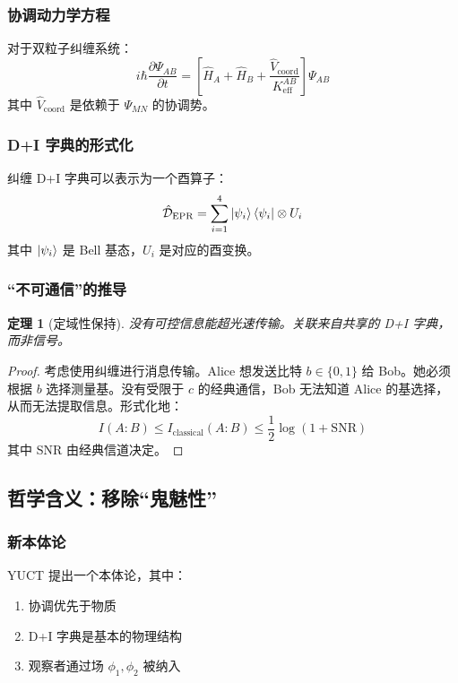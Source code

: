 \documentclass[11pt,a4paper]{article}
\newtheorem{theorem}{定理}
\begin{document}
	\subsubsection{协调动力学方程}
	对于双粒子纠缠系统：
	\begin{equation}
		i\hbar \frac{\partial \Psi_{AB}}{\partial t} = \left[ \hat{H}_A + \hat{H}_B + \frac{\hat{V}_{\text{coord}}}{K_{\mathrm{eff}}^{AB}} \right] \Psi_{AB}
	\end{equation}
	其中 $\hat{V}_{\text{coord}}$ 是依赖于 $\Psi_{MN}$ 的协调势。
	
	\subsubsection{D+I 字典的形式化}
	纠缠 D+I 字典可以表示为一个酉算子：
	\begin{equation}
		\hat{\mathcal{D}}_{\text{EPR}} = \sum_{i=1}^{4} \ket{\psi_i}\bra{\psi_i} \otimes U_i
	\end{equation}
	其中 $\ket{\psi_i}$ 是 Bell 基态，$U_i$ 是对应的酉变换。
	
	\subsubsection{“不可通信”的推导}
	\begin{theorem}[定域性保持]
		没有可控信息能超光速传输。关联来自共享的 D+I 字典，而非信号。
	\end{theorem}
	
	\begin{proof}
		考虑使用纠缠进行消息传输。Alice 想发送比特 $b \in \{0,1\}$ 给 Bob。她必须根据 $b$ 选择测量基。没有受限于 $c$ 的经典通信，Bob 无法知道 Alice 的基选择，从而无法提取信息。形式化地：
		\begin{equation}
			I(A:B) \leq I_{\text{classical}}(A:B) \leq \frac{1}{2} \log(1 + \text{SNR})
		\end{equation}
		其中 SNR 由经典信道决定。
	\end{proof}
	
	\subsection{哲学含义：移除“鬼魅性”}
	\label{subsec:philosophical}
	
	\subsubsection{新本体论}
	YUCT 提出一个本体论，其中：
	\begin{enumerate}
		\item 协调优先于物质
		\item D+I 字典是基本的物理结构
		\item 观察者通过场 $\phi_1, \phi_2$ 被纳入
	\end{enumerate}
	
\end{document}
